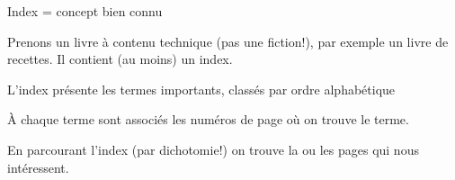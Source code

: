 \begin{frame}{Index = concept bien connu}

Prenons un livre à contenu technique (pas une fiction!), par
exemple un livre de recettes. Il contient (au moins) un index.

\vfill
\begin{blocgauche}
\begin{redbullet}
  \item L'index présente les termes importants, classés par ordre alphabétique
  
  \item À chaque terme sont associés les numéros de page où on trouve le terme.
  
  \item En parcourant l'index (par dichotomie!) on trouve la ou les pages qui nous intéressent.
\end{redbullet}
\end{blocgauche}
\end{frame}

